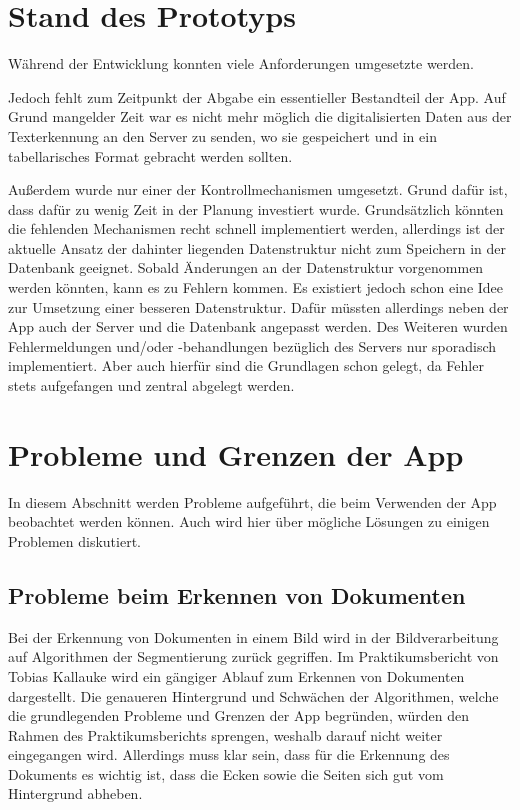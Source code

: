 \documentclass[notables, nomenclature, oneside, 150]{HSMW-Thesis}
\begin{document}
	\section{Stand des Prototyps}
		Während der Entwicklung konnten viele Anforderungen umgesetzte werden. 
		
		Jedoch fehlt zum Zeitpunkt der Abgabe ein essentieller Bestandteil der App. Auf Grund mangelder Zeit war es nicht mehr möglich die digitalisierten Daten aus der Texterkennung an den Server zu senden, wo sie gespeichert und in ein tabellarisches Format gebracht werden sollten. 
		
		Außerdem wurde nur einer der Kontrollmechanismen umgesetzt. Grund dafür ist, dass dafür zu wenig Zeit in der Planung investiert wurde. Grundsätzlich könnten die fehlenden Mechanismen recht schnell implementiert werden, allerdings ist der aktuelle Ansatz der dahinter liegenden Datenstruktur nicht zum Speichern in der Datenbank geeignet. Sobald Änderungen an der Datenstruktur vorgenommen werden könnten, kann es zu Fehlern kommen. Es existiert jedoch schon eine Idee zur Umsetzung einer besseren Datenstruktur. Dafür müssten allerdings neben der App auch der Server und die Datenbank angepasst werden. Des Weiteren wurden Fehlermeldungen und/oder -behandlungen bezüglich des Servers nur sporadisch implementiert. Aber auch hierfür sind die Grundlagen schon gelegt, da Fehler stets aufgefangen und zentral abgelegt werden. 
	
%	
%	
%	
%	
%	
%	
	\section{Probleme und Grenzen der App}\label{sc:grenzen}
		In diesem Abschnitt werden Probleme aufgeführt, die beim Verwenden der App beobachtet werden können. Auch wird hier über mögliche Lösungen zu einigen Problemen diskutiert.

		\subsection{Probleme beim Erkennen von Dokumenten}\label{ssc:erkennen}
			Bei der Erkennung von Dokumenten in einem Bild wird in der Bildverarbeitung auf Algorithmen der Segmentierung zurück gegriffen. Im Praktikumsbericht von Tobias Kallauke wird ein gängiger Ablauf zum Erkennen von Dokumenten dargestellt. Die genaueren Hintergrund und Schwächen der Algorithmen, welche die grundlegenden Probleme und Grenzen der App begründen, würden den Rahmen des Praktikumsberichts sprengen, weshalb darauf nicht weiter eingegangen wird. Allerdings muss klar sein, dass für die Erkennung des Dokuments es wichtig ist, dass die Ecken sowie die Seiten sich gut vom Hintergrund abheben.
		
\end{document}
